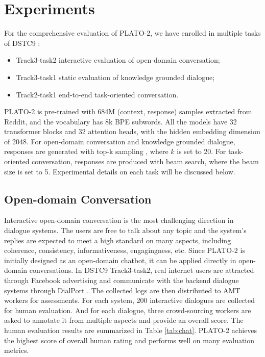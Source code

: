 \documentclass[letterpaper]{article} \usepackage{aaai21}  \usepackage{times}  \usepackage{helvet} \usepackage{courier}  \usepackage[hyphens]{url}  \usepackage{graphicx} \urlstyle{rm} \def\UrlFont{\rm}  \usepackage{natbib}  \usepackage{caption} \frenchspacing  \setlength{\pdfpagewidth}{8.5in}  \setlength{\pdfpageheight}{11in}  \usepackage{amsmath}
\begin{document}
\section{Experiments}
For the comprehensive evaluation of PLATO-2, we have enrolled in multiple tasks of DSTC9 \cite{gunasekara2020overview}:
\begin{itemize}
    \item Track3-task2 interactive evaluation of open-domain conversation;
    \item Track3-task1 static evaluation of knowledge grounded dialogue;
    \item Track2-task1 end-to-end task-oriented conversation.
\end{itemize}
PLATO-2 is pre-trained with 684M (context, response) samples extracted from Reddit, and the vocabulary has 8k BPE subwords. All the models have 32 transformer blocks and 32 attention heads, with the hidden embedding dimension of 2048. For open-domain conversation and knowledge grounded dialogue, responses are generated with top-k sampling \cite{fan2018hierarchical}, where $k$ is set to 20. For task-oriented conversation, responses are produced with beam search, where the beam size is set to 5. Experimental details on each task will be discussed below.

\subsection{Open-domain Conversation}
Interactive open-domain conversation is the most challenging direction in dialogue systems. The users are free to talk about any topic and the system's replies are expected to meet a high standard on many aspects, including coherence, consistency, informativeness, engagingness, etc. Since PLATO-2 is initially designed as an open-domain chatbot, it can be applied directly in open-domain conversations. In DSTC9 Track3-task2, real internet users are attracted through Facebook advertising and communicate with the backend dialogue systems through DialPort \cite{zhao2016dialport}. The collected logs are then distributed to AMT workers for assessments. For each system, 200 interactive dialogues are collected for human evaluation. And for each dialogue, three crowd-sourcing workers are asked to annotate it from multiple aspects and provide an overall score. The human evaluation results are summarized in Table \ref{tab:chat}. PLATO-2 achieves the highest score of overall human rating and performs well on many evaluation metrics.
\end{document}
